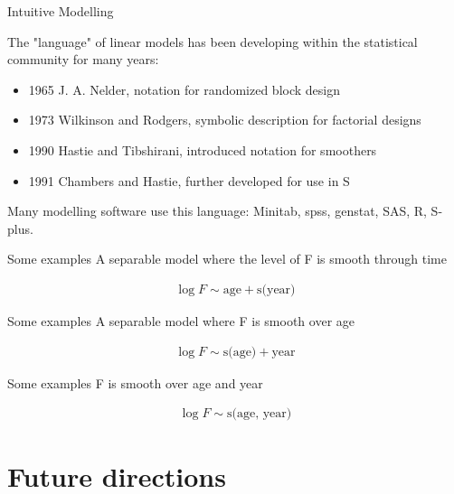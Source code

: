 \documentclass{beamer}\usepackage[]{graphicx}\usepackage[]{color}
\begin{document}
\begin{frame}{Intuitive Modelling}

The "language" of linear models has been developing within the statistical community for many years:

  \begin{itemize}
  \item 1965 J. A. Nelder, notation for randomized block design
  \item 1973 Wilkinson and Rodgers, symbolic description for factorial designs
  \item 1990 Hastie and Tibshirani, introduced notation for smoothers
  \item 1991 Chambers and Hastie, further developed for use in S
  \end{itemize}

Many modelling software use this language:  Minitab, spss, genstat, SAS, R, S-plus.

\end{frame}


\begin{frame}{Some examples}
A separable model where the level of F is smooth through time

\begin{align*}
  \log F \sim \text{age} + \text{s(year)}
\end{align*}
\end{frame}


\begin{frame}{Some examples}
A separable model where F is smooth over age

\begin{align*}
  \log F \sim \text{s(age)} + \text{year}
\end{align*}
\end{frame}


\begin{frame}{Some examples}
F is smooth over age and year

\begin{align*}
  \log F \sim \text{s(age, year)}
\end{align*}
\end{frame}

\section{Future directions} %

\end{document}
